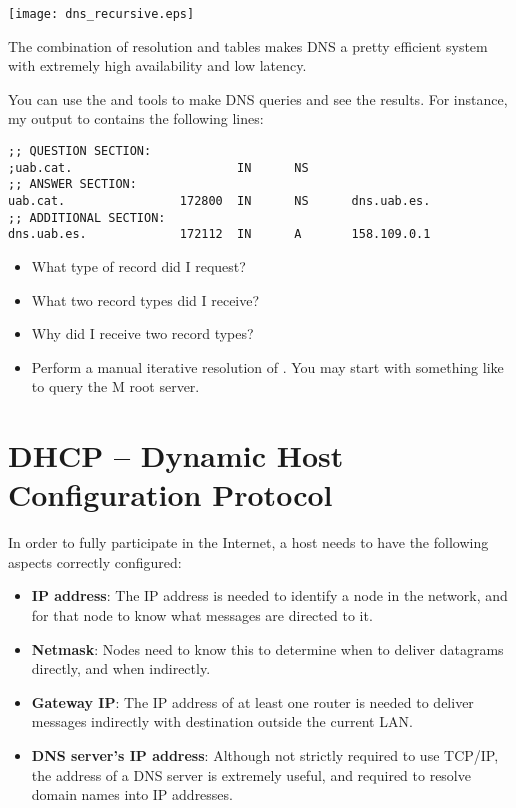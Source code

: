 \begin{center}
\texttt{[image: dns\_recursive.eps]}
\end{center}

The combination of  resolution and  tables makes
DNS a pretty efficient system with extremely high availability and low latency.

\begin{exercise}
You can use the  and  tools to make DNS queries
and see the results. For instance, my output to 
contains the following lines:

\vspace{0.25cm}
\begin{verbatim}
;; QUESTION SECTION:
;uab.cat.                       IN      NS
;; ANSWER SECTION:
uab.cat.                172800  IN      NS      dns.uab.es.
;; ADDITIONAL SECTION:
dns.uab.es.             172112  IN      A       158.109.0.1
\end{verbatim}
\vspace{0.25cm}

\begin{itemize}
\item What type of record did I request?
\item What two record types did I receive?
\item Why did I receive two record types?
\item Perform a manual iterative resolution of .
  You may start with something like 
  to query the M root server.
\end{itemize}
\end{exercise}


\section{DHCP -- Dynamic Host Configuration Protocol}

In order to fully participate in the Internet, a host needs to have 
the following aspects correctly configured:
\begin{itemize}
\item \textbf{IP address}:
The IP address is needed to identify a node in the network, and for that node to know what messages are directed to it.
\item \textbf{Netmask}:
Nodes need to know this to determine when to deliver datagrams directly, and when indirectly.
\item \textbf{Gateway IP}:
The IP address of at least one router is needed to deliver messages indirectly with destination outside the current LAN.
\item \textbf{DNS server's IP address}:
Although not strictly required to use TCP/IP, the address of a DNS server is extremely useful, and required to resolve
domain names into IP addresses.
\end{itemize}

